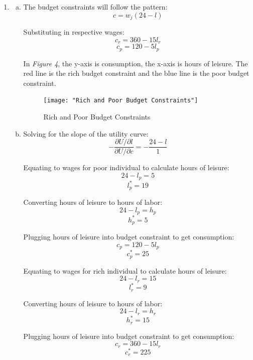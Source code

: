 \documentclass{article}
\begin{document}
\begin{enumerate}[1.]
    \item 
        \begin{enumerate}[a.]
            \item The budget constraints will follow the pattern:
                $$ c = w_{j} ( 24 - l ) $$

                Substituting in respective wages:
                $$ c_{r} = 360 - 15l_{r} $$
                $$ c_{p} = 120 - 5l_{p} $$

                In \textit{Figure 4}, the y-axis is consumption, the x-axis is
                hours of leisure. The red line is the rich budget constraint and
                the blue line is the poor budget constraint.

                \begin{figure}[H]
                    \centering
                    \texttt{[image: "Rich and Poor Budget
                    Constraints"]}
                    \caption{Rich and Poor Budget Constraints}
                \end{figure}

            \item Solving for the slope of the utility curve:
                $$ -\frac{ \partial U / \partial l }{ \partial U / \partial c }
                = -\frac{ 24 - l }{ 1 }$$

                Equating to wages for poor individual to calculate hours of
                leisure:
                $$ 24 - l_{p} = 5 $$
                $$ l_{p}^{*} = 19 $$

                Converting hours of leisure to hours of labor:
                $$ 24 - l_{p} = h_{p} $$
                $$ h_{p}^{*} = 5 $$

                Plugging hours of leisure into budget constraint to get
                consumption:
                $$ c_{p} = 120 - 5l_{p} $$
                $$ c_{p}^{*} =  25$$

                Equating to wages for rich individual to calculate hours of
                leisure:
                $$ 24 - l_{r} = 15 $$
                $$ l_{r}^{*} = 9 $$

                Converting hours of leisure to hours of labor:
                $$ 24 - l_{r} = h_{r} $$
                $$ h_{r}^{*} = 15 $$

                Plugging hours of leisure into budget constraint to get
                consumption:
                $$ c_{r} = 360 - 15 l_{r} $$
                $$ c_{r}^{*} = 225 $$


\end{enumerate}
\end{enumerate}
\end{document}
